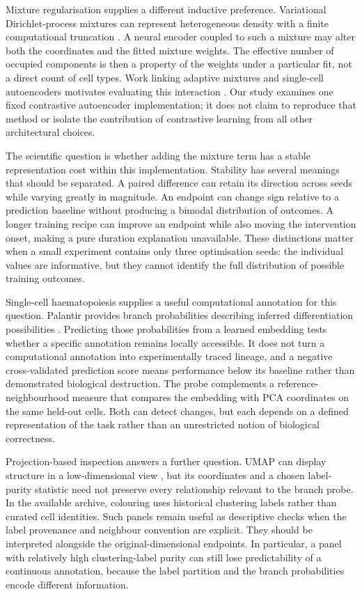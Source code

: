 \documentclass[11pt]{article}
\begin{document}
Mixture regularisation supplies a different inductive preference. Variational Dirichlet-process mixtures can represent heterogeneous density with a finite computational truncation \cite{blei2006variational}. A neural encoder coupled to such a mixture may alter both the coordinates and the fitted mixture weights. The effective number of occupied components is then a property of the weights under a particular fit, not a direct count of cell types. Work linking adaptive mixtures and single-cell autoencoders motivates evaluating this interaction \cite{an2024scdac}. Our study examines one fixed contrastive autoencoder implementation; it does not claim to reproduce that method or isolate the contribution of contrastive learning from all other architectural choices.

The scientific question is whether adding the mixture term has a stable representation cost within this implementation. Stability has several meanings that should be separated. A paired difference can retain its direction across seeds while varying greatly in magnitude. An endpoint can change sign relative to a prediction baseline without producing a bimodal distribution of outcomes. A longer training recipe can improve an endpoint while also moving the intervention onset, making a pure duration explanation unavailable. These distinctions matter when a small experiment contains only three optimisation seeds: the individual values are informative, but they cannot identify the full distribution of possible training outcomes.

Single-cell haematopoiesis supplies a useful computational annotation for this question. Palantir provides branch probabilities describing inferred differentiation possibilities \cite{setty2019palantir}. Predicting those probabilities from a learned embedding tests whether a specific annotation remains locally accessible. It does not turn a computational annotation into experimentally traced lineage, and a negative cross-validated prediction score means performance below its baseline rather than demonstrated biological destruction. The probe complements a reference-neighbourhood measure that compares the embedding with PCA coordinates on the same held-out cells. Both can detect changes, but each depends on a defined representation of the task rather than an unrestricted notion of biological correctness.

Projection-based inspection answers a further question. UMAP can display structure in a low-dimensional view \cite{mcinnes2018umap}, but its coordinates and a chosen label-purity statistic need not preserve every relationship relevant to the branch probe. In the available archive, colouring uses historical clustering labels rather than curated cell identities. Such panels remain useful as descriptive checks when the label provenance and neighbour convention are explicit. They should be interpreted alongside the original-dimensional endpoints. In particular, a panel with relatively high clustering-label purity can still lose predictability of a continuous annotation, because the label partition and the branch probabilities encode different information.
\end{document}
